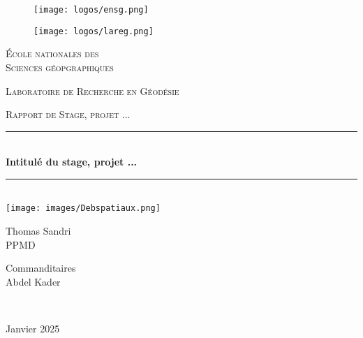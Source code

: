 \documentclass[a4paper,11pt]{report}
\begin{document}
\renewcommand{\contentsname}{Sommaire}            %
\renewcommand{\listfigurename}{Liste des figures} %
\renewcommand{\listtablename}{Liste des tableaux} %

\begin{titlepage}   %


\begin{figure}[h]
\begin{minipage}{0.20\textwidth}
\centering
\texttt{[image: logos/ensg.png]}
\end{minipage}
\hfill
\begin{minipage}{0.20\textwidth}
\centering
\texttt{[image: logos/lareg.png]}
\end{minipage}
\end{figure}
\noindent
\begin{minipage}{0.25\textwidth}
\begin{flushleft}
\textsc{École nationales des \\
Sciences géopgraphiques}
\end{flushleft}
\end{minipage}
\hfill
\begin{minipage}{0.25\textwidth}
\begin{flushright}
\textsc{Laboratoire de Recherche en Géodésie}
\end{flushright}
\end{minipage}
\vspace{3.0cm}
\begin{center}
\textsc{\Large Rapport de Stage, projet ... }
\end{center}
\begin{center}
\rule{\textwidth}{0.6mm}\\[0.4cm]
{\LARGE \bfseries{Intitulé du stage, projet ...}}\\[0.4cm]
\rule{\textwidth}{0.6mm}\\[1cm]

\texttt{[image: images/Debspatiaux.png]}\\[1.5cm]
\end{center}

\begin{minipage}{0.25\textwidth}
\begin{flushleft}
Thomas Sandri \\
PPMD
\end{flushleft}
\end{minipage}
\hfill
\begin{minipage}{0.25\textwidth}
\begin{flushright}
Commanditaires \\
Abdel Kader
\end{flushright}
\end{minipage}\\[0.7cm]
\begin{center}
Janvier 2025
\end{center}
\end{titlepage}   %
\end{document}

